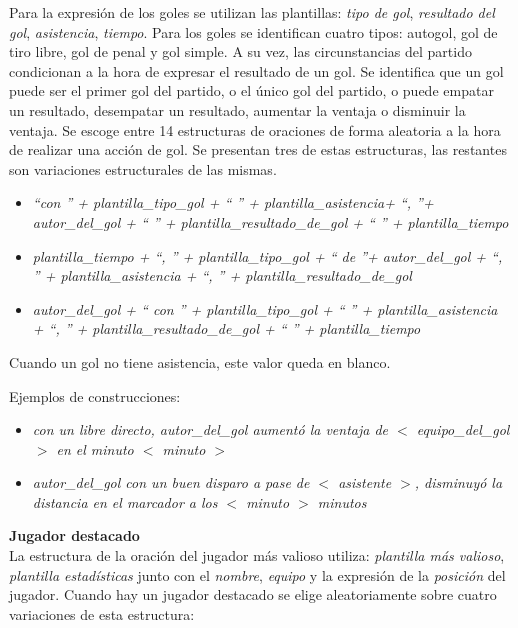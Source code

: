     Para la expresión de los goles se utilizan las plantillas: \textit{tipo de gol}, \textit{resultado del gol}, 
    \textit{asistencia}, \textit{tiempo}. Para los goles se identifican cuatro tipos: autogol, gol de tiro libre, 
    gol de penal y gol simple. A su vez, las circunstancias del partido condicionan a la hora de expresar el resultado 
    de un gol. Se identifica que un gol puede ser el primer gol del partido, o el único gol del partido, o puede empatar 
    un resultado, desempatar un resultado, aumentar la ventaja o disminuir la ventaja.
    Se escoge entre 14 estructuras de oraciones de forma aleatoria a la hora de realizar una acción de gol. Se presentan tres 
    de estas estructuras, las restantes son variaciones estructurales de las mismas.
    

    \begin{itemize}
        \item \textit{ “con ” + plantilla\_tipo\_gol + “ ” + plantilla\_asistencia+ “, ”+ autor\_del\_gol + “ ” + plantilla\_resultado\_de\_gol + “ ” + plantilla\_tiempo}
        \item \textit{plantilla\_tiempo + “, ” + plantilla\_tipo\_gol + “ de ”+ autor\_del\_gol + “, ” + plantilla\_asistencia + “, ” + plantilla\_resultado\_de\_gol}
        \item \textit{autor\_del\_gol + “ con ” + plantilla\_tipo\_gol + “ ” + plantilla\_asistencia + “, ” + plantilla\_resultado\_de\_gol + “ ” + plantilla\_tiempo}
    \end{itemize}

    Cuando un gol no tiene asistencia, este valor queda en blanco.

    Ejemplos de construcciones:

    \begin{itemize}
        \item \textit{con un libre directo, autor\_del\_gol aumentó la ventaja de $<$ equipo\_del\_gol $>$ en el minuto $<$ minuto $>$}
        \item \textit{autor\_del\_gol con un buen disparo a pase de $<$ asistente $>$, disminuyó la distancia en el marcador a los $<$ minuto $>$ minutos} 
    \end{itemize}

\textbf{Jugador destacado}\\

    La estructura de la oración del jugador más valioso utiliza: \textit{plantilla más valioso}, \textit{plantilla estadísticas} junto con el \textit{nombre}, 
\textit{equipo} y la expresión de la  \textit{posición} del jugador.
    Cuando hay un jugador destacado se elige aleatoriamente sobre cuatro variaciones de esta estructura:
    
